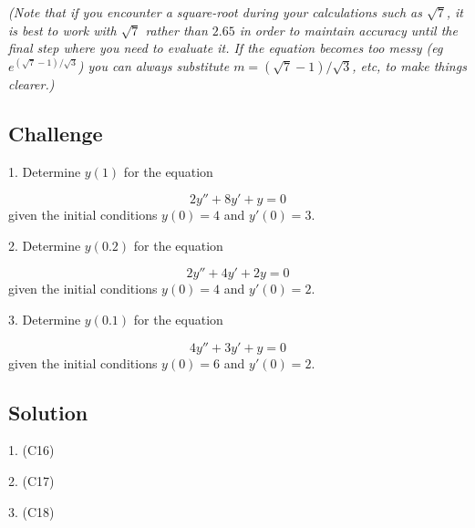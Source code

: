\emph{(Note that if you encounter a square-root during your calculations such as $\sqrt{7}$, it is best to work with $\sqrt{7}$ rather than $2.65$ in order to maintain accuracy until the final step where you need to evaluate it. If the equation becomes too messy (eg $e^{(\sqrt{7}-1)/\sqrt{3}}$) you can always substitute $m=(\sqrt{7}-1)/\sqrt{3}$, etc, to make things clearer.)}

\subsection*{Challenge}
1. Determine $y(1)$ for the equation

\begin{equation}
    2 y''+8y'+y=0    
\end{equation}
given the initial conditions $y(0)=4$ and $y'(0)=3$.

2. Determine $y(0.2)$ for the equation

\begin{equation}
    2y''+4y'+2y=0
\end{equation}
given the initial conditions $y(0)=4$ and $y'(0)=2$.

3. Determine $y(0.1)$ for the equation

\begin{equation}
    4y''+3y'+y=0
\end{equation}
given the initial conditions $y(0)=6$ and $y'(0)=2$.


\subsection*{Solution}
1. (C16) %

2. (C17) %

3. (C18) %




